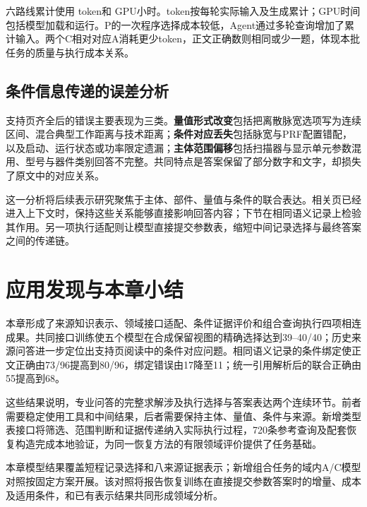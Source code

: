 \begin{table}[htbp]
\centering\small
\caption{记录选择与最终回答的推理成本}
\label{tab:domain-cost}
\resizebox{\linewidth}{!}{\DomainCostTable}
\end{table}

六路线累计使用\DomainTotalTokens{} token和\DomainGPUHours{} GPU小时。token按每轮实际输入及生成累计；GPU时间包括模型加载和运行。P的一次程序选择成本较低，Agent通过多轮查询增加了累计输入。两个C相对对应A消耗更少token，正文正确数则相同或少一题，体现本批任务的质量与执行成本关系。

\subsection{条件信息传递的误差分析}

支持页齐全后的错误主要表现为三类。\textbf{量值形式改变}包括把离散脉宽选项写为连续区间、混合典型工作距离与技术距离；\textbf{条件对应丢失}包括脉宽与PRF配置错配，以及启动、运行状态或功率限定遗漏；\textbf{主体范围偏移}包括扫描器与显示单元参数混用、型号与器件类别回答不完整。共同特点是答案保留了部分数字和文字，却损失了原文中的对应关系。

这一分析将后续表示研究聚焦于主体、部件、量值与条件的联合表达。相关页已经进入上下文时，保持这些关系能够直接影响回答内容；下节在相同语义记录上检验其作用。另一项执行适配则让模型直接提交参数表，缩短中间记录选择与最终答案之间的传递链。






\section{应用发现与本章小结}

本章形成了来源知识表示、领域接口适配、条件证据评价和组合查询执行四项相连成果。共同接口训练使五个模型在合成保留视图的精确选择达到39--40/40；历史来源问答进一步定位出支持页阅读中的条件对应问题。相同语义记录的条件绑定使正文正确由73/96提高到80/96，绑定错误由17降至11；统一引用解析后的联合正确由55提高到68。

这些结果说明，专业问答的完整求解涉及执行选择与答案表达两个连续环节。前者需要稳定使用工具和中间结果，后者需要保持主体、量值、条件与来源。新增类型表接口将筛选、范围判断和证据传递纳入实际执行过程，720条参考查询及配套恢复构造完成本地验证，为同一恢复方法的有限领域评价提供了任务基础。

本章模型结果覆盖短程记录选择和八来源证据表示；新增组合任务的域内A/C模型对照按固定方案开展。该对照将报告恢复训练在直接提交参数答案时的增量、成本及适用条件，和已有表示结果共同形成领域分析。
